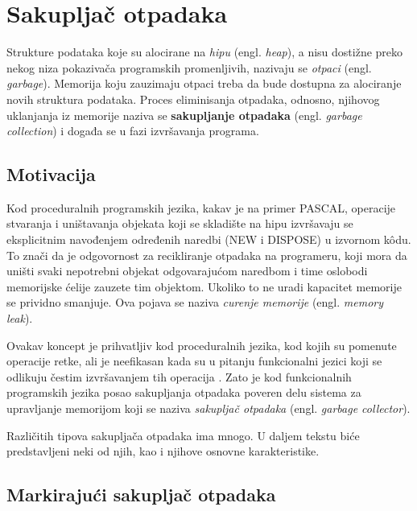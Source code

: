 \section{Sakupljač otpadaka}
\label{sec:djubretar}


Strukture podataka koje su alocirane na \textit{hipu} (engl. \textit{heap}), a nisu dostižne preko nekog niza pokazivača programskih promenljivih, nazivaju se \textit{otpaci} (engl. \textit{garbage}). Memorija koju zauzimaju otpaci treba da bude dostupna za alociranje novih struktura podataka. Proces eliminisanja otpadaka, odnosno, njihovog uklanjanja iz memorije naziva se \textbf{sakupljanje otpadaka} (engl. \textit{garbage collection}) i događa se u fazi izvršavanja programa.

\subsection{Motivacija}

Kod proceduralnih programskih jezika, kakav je na primer PASCAL, operacije stvaranja i uništavanja objekata koji se skladište na hipu izvršavaju se eksplicitnim navođenjem određenih naredbi (NEW i DISPOSE) u izvornom k\^odu. To znači da je odgovornost za recikliranje otpadaka na programeru, koji mora da uništi svaki nepotrebni objekat odgovarajućom naredbom i time oslobodi memorijske ćelije zauzete tim objektom. Ukoliko to ne uradi kapacitet memorije se prividno smanjuje. Ova pojava se naziva \textit{curenje memorije} (engl. \textit{memory leak}).

Ovakav koncept je prihvatljiv kod proceduralnih jezika, kod kojih su pomenute operacije retke, ali je neefikasan kada su u pitanju funkcionalni jezici koji se odlikuju čestim izvršavanjem tih operacija \cite{appel}. Zato je kod funkcionalnih programskih jezika posao sakupljanja otpadaka poveren delu sistema za upravljanje memorijom koji se naziva \textit{sakupljač otpadaka} (engl. \textit{garbage collector}).

Različitih tipova sakupljača otpadaka ima mnogo. U daljem tekstu biće predstavljeni neki od njih, kao i njihove osnovne karakteristike.

\subsection{Markirajući sakupljač otpadaka}

